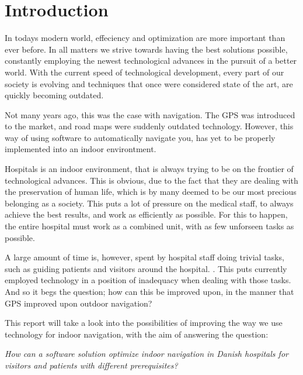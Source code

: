 \chapter{Introduction}\label{intro}

In todays modern world, effeciency and optimization are more important than ever before. In all matters we strive towards having the best solutions possible, constantly employing the newest technological advances in the pursuit of a better world. With the current speed of technological development, every part of our society is evolving and techniques that once were considered state of the art, are quickly becoming outdated.

Not many years ago, this was the case with navigation. The GPS was introduced to the market, and road maps were suddenly outdated technology. However, this way of using software to automatically navigate you, has yet to be properly implemented into an indoor environtment.

Hospitals is an indoor environment, that is always trying to be on the frontier of technological advances. This is obvious, due to the fact that they are dealing with the preservation of human life, which is by many deemed to be our most precious belonging as a society. This puts a lot of pressure on the medical staff, to always achieve the best results, and work as efficiently as possible. For this to happen, the entire hospital must work as a combined unit, with as few unforseen tasks as possible.

A large amount of time is, however, spent by hospital staff doing trivial tasks, such as guiding patients and visitors around the hospital. \cite{findvejintro} \cite{timewaste}. This puts currently employed technology in a position of inadequacy when dealing with those tasks. And so it begs the question; how can this be improved upon, in the manner that GPS improved upon outdoor navigation?

This report will take a look into the possibilities of improving the way we use technology for indoor navigation, with the aim of answering the question:

\textit{How can a software solution optimize indoor navigation in Danish hospitals for visitors and patients with different prerequisites?}\label{sub:init}






